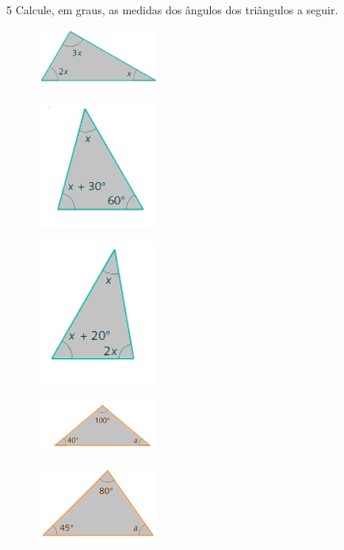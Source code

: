 \num{5} Calcule, em graus, as medidas dos ângulos dos triângulos a seguir.

\begin{escolha}
\item
\begin{figure}[H]
\centering\includegraphics[width=4cm]{./imgSAEB_8_MAT/media/image24.png}
\end{figure}
\item
\begin{figure}[H]
\centering\includegraphics[width=4cm]{./imgSAEB_8_MAT/media/image25.png}
\end{figure}
\item
\begin{figure}[H]
\centering\includegraphics[width=4cm]{./imgSAEB_8_MAT/media/image26.png}
\end{figure}
\item
\begin{figure}[H]
\centering\includegraphics[width=4cm]{./imgSAEB_8_MAT/media/image27.png}
\end{figure}
\item
\begin{figure}[H]
\centering\includegraphics[width=4cm]{./imgSAEB_8_MAT/media/image28.png}

\end{figure}
\end{escolha}
